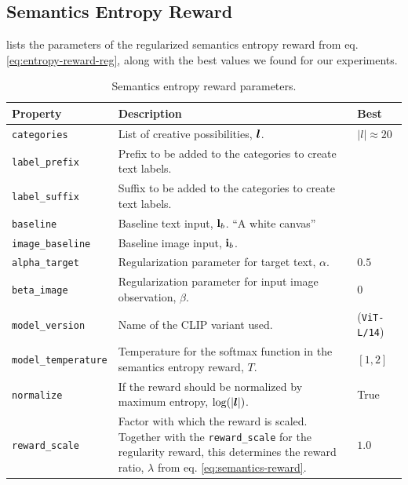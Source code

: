 \subsection{Semantics Entropy Reward}
\label{sec:semantics-entropy-reward-details}

 lists the parameters of the regularized semantics entropy reward from eq. \eqref{eq:entropy-reward-reg}, along with the best values we found for our experiments.
\begin{table}[H]
    \centering
    \caption{Semantics entropy reward parameters.}
    \begin{tabularx}{\textwidth}{C{3.9cm} L C{2cm}}
        \hline
        Property & Description & Best\\
        \hline
        \texttt{categories} & List of creative possibilities, \(\bm{l}\). & \(|l| \approx 20\)\\
        \texttt{label\_prefix} & Prefix to be added to the categories to create text labels.\\
        \texttt{label\_suffix} & Suffix to be added to the categories to create text labels.\\
        \texttt{baseline} & Baseline text input, \(\mathbf{l}_b\). ``A white canvas''\\
        \texttt{image\_baseline} & Baseline image input, \(\mathbf{i}_b\).\\
        \texttt{alpha\_target} & Regularization parameter for target text, \(\alpha\). & \(0.5\)\footnotemark[1]\\
        \texttt{beta\_image} & Regularization parameter for input image observation, \(\beta\). & \(0\)\footnotemark[1]\\
        \texttt{model\_version} & Name of the CLIP variant used. & (\texttt{ViT-L/14})\\
        \texttt{model\_temperature} & Temperature for the softmax function in the semantics entropy reward, \(T\). & \([1, 2]\)\\
        \texttt{normalize} & If the reward should be normalized by maximum entropy, \(\log(|\bm{l}|)\). & True\\
        \texttt{reward\_scale} & Factor with which the reward is scaled. Together with the \texttt{reward\_scale} for the regularity reward, this determines the reward ratio, \(\lambda\) from eq. \eqref{eq:semantics-reward}. & \(1.0\)\\
        \hline
    \end{tabularx}
    \label{tab:entropy-reward-params}
\end{table}

